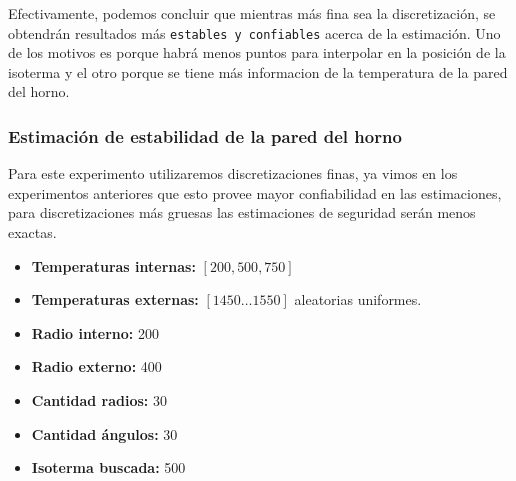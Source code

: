 \vspace{0.5cm}

Efectivamente, podemos concluir que mientras más fina sea la discretización, se obtendrán resultados más \texttt{estables y confiables} acerca de la estimación. Uno de los motivos es porque habrá menos puntos para interpolar en la posición de la isoterma y el otro porque se tiene más informacion de la temperatura de la pared del horno.

\subsubsection{Estimación de estabilidad de la pared del horno}
Para este experimento utilizaremos discretizaciones finas, ya vimos en los experimentos anteriores que esto provee mayor confiabilidad en las estimaciones, para discretizaciones más gruesas las estimaciones de seguridad serán menos exactas.
\vspace{0.5cm}

\begin{itemize}
	\item \textbf{Temperaturas internas:} $[200, 500, 750]$
	\item \textbf{Temperaturas externas:} $[1450\dots1550]$ aleatorias uniformes.
	\item \textbf{Radio interno:} 200
	\item \textbf{Radio externo:} 400
	\item \textbf{Cantidad radios:} 30
	\item \textbf{Cantidad ángulos:} 30
	\item \textbf{Isoterma buscada:} 500
\end{itemize}

